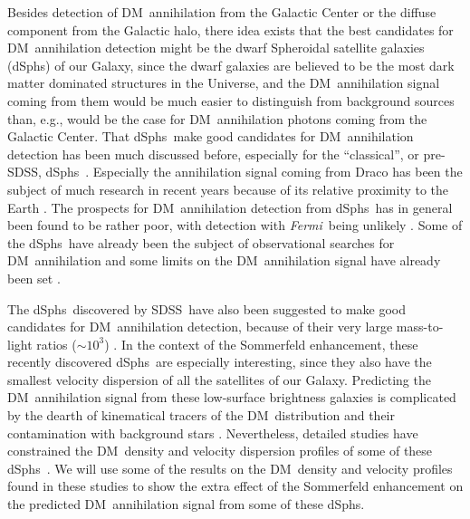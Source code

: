 \documentclass[aps,prd,twocolumn,amsmath,amssymb,floatfix,nofootinbib,10pt]{revtex4}
\newcommand{\eg}{e.g.}
\newcommand{\Fermi}{\emph{Fermi}}
\newcommand{\DM}{DM}
\newcommand{\dSphs}{dSphs}
\newcommand{\SDSS}{SDSS}
\begin{document}
Besides detection of \DM\ annihilation from the Galactic Center or the
diffuse component from the Galactic halo, there idea exists that the
best candidates for \DM\ annihilation detection might be the dwarf
Spheroidal satellite galaxies (\dSphs) of our Galaxy, since the dwarf
galaxies are believed to be the most dark matter dominated structures
in the Universe, and the \DM\ annihilation signal coming from them
would be much easier to distinguish from background sources than, \eg,
would be the case for \DM\ annihilation photons coming from the
Galactic Center. That \dSphs\ make good candidates for \DM\
annihilation detection has been much discussed before, especially for
the ``classical'', or pre-\SDSS, \dSphs\
\cite{2000PhRvD..61b3514B,2002PhRvD..66b3509T,2004PhRvD..70b3512B,2004PhRvD..69l3501E,2004PhRvD..70d3503P,2004PhRvL..93p1302H}. Especially
the annihilation signal coming from Draco has been the subject of much
research in recent years because of its relative proximity to the
Earth
\cite{2002PhRvD..66b3509T,2004PhRvD..70d3503P,2006PhRvD..73f3510B,2006JCAP...03..003P,2007PhRvD..75b3513C,2007PhRvD..76l3509S,2007PhRvD..75h3526S,2008arXiv0812.1494P}. The
prospects for \DM\ annihilation detection from \dSphs\ has in general
been found to be rather poor, with detection with \Fermi\ being
unlikely \cite{2008arXiv0812.1494P}. Some of the \dSphs\ have already
been the subject of observational searches for \DM\ annihilation and
some limits on the \DM\ annihilation signal have already been set
\cite{2008ApJ...678..594W,2008ApJ...679..428A,2008APh....29...55A,2008PhRvD..78h7101D,2009ApJ...691..175A,2008arXiv0810.3561M}.








The \dSphs\ discovered by \SDSS\ have also been suggested to make good
candidates for \DM\ annihilation detection, because of their very
large mass-to-light ratios ($\sim\!10^3$)
\cite{2008ApJ...678..614S,2008arXiv0809.2781G}. In the context of the
Sommerfeld enhancement, these recently discovered \dSphs\ are
especially interesting, since they also have the smallest velocity
dispersion of all the satellites of our Galaxy. Predicting the \DM\
annihilation signal from these low-surface brightness galaxies is
complicated by the dearth of kinematical tracers of the \DM\
distribution and their contamination with background stars
\cite{2009AJ....137.3109W}. Nevertheless, detailed studies have
constrained the \DM\ density and velocity dispersion profiles of some
of these \dSphs\
\cite{2007PhRvD..75h3526S,2007ApJ...667L..53W,2008ApJ...672..904P}. We
will use some of the results on the \DM\ density and velocity profiles
found in these studies to show the extra effect of the Sommerfeld
enhancement on the predicted \DM\ annihilation signal from some of
these \dSphs.
\end{document}
